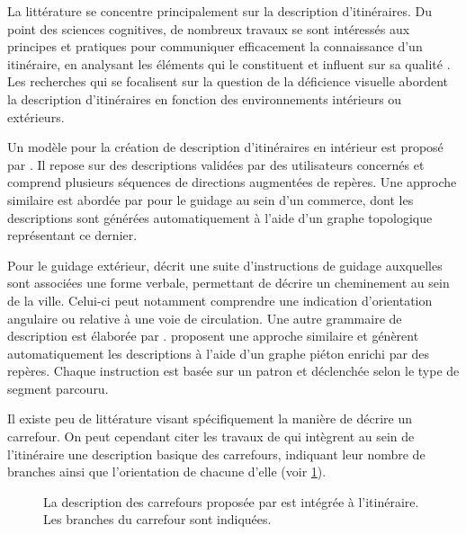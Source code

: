 \newpar{}


La littérature se concentre principalement sur la description d'itinéraires. Du point des sciences cognitives, de nombreux travaux se sont intéressés aux principes et pratiques pour communiquer efficacement la connaissance d’un itinéraire, en analysant les éléments qui le constituent et influent sur sa qualité \cite{Allen2000,Lovelace1999}. Les recherches qui se focalisent sur la question de la déficience visuelle abordent la description d'itinéraires en fonction des environnements intérieurs ou extérieurs.

Un modèle pour la création de description d'itinéraires en intérieur est proposé par \cite{Troeger2020}. Il repose sur des descriptions validées par des utilisateurs concernés et comprend plusieurs séquences de directions augmentées de repères. Une approche similaire est abordée par \cite{Kulyukin2008} pour le guidage au sein d'un commerce, dont les descriptions sont générées automatiquement à l'aide d'un graphe topologique représentant ce dernier.

Pour le guidage extérieur, \cite{gaunet_verbal_2006} décrit une suite d’instructions de guidage auxquelles sont associées une forme verbale, permettant de décrire un cheminement au sein de la ville. Celui-ci peut notamment comprendre une indication d’orientation angulaire ou relative à une voie de circulation. Une autre grammaire de description est élaborée par \cite{Constantinescu2019}. \cite{Balata2016} proposent une approche similaire et génèrent automatiquement les descriptions à l'aide d'un graphe piéton enrichi par des repères. Chaque instruction est basée sur un patron et déclenchée selon le type de segment parcouru.



\newpar{}

Il existe peu de littérature visant spécifiquement la manière de décrire un carrefour. On peut cependant citer les travaux de \cite{gaunet_verbal_2006} qui intègrent au sein de l'itinéraire une description basique des carrefours, indiquant leur nombre de branches ainsi que l'orientation de chacune d'elle (voir \ref{fig:exdesccarrefour}).

\begin{figure}
    \centering
    \caption{La description des carrefours proposée par \cite{gaunet_verbal_2006} est intégrée à l'itinéraire. Les branches du carrefour sont indiquées.}
    \label{fig:exdesccarrefour}
\end{figure}

